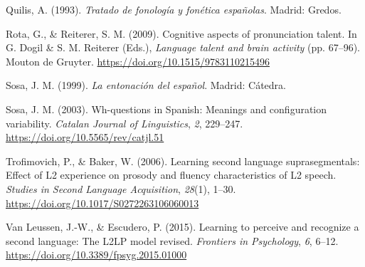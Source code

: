 \documentclass[]{article}
\newlength{\cslhangindent}
\newenvironment{CSLReferences}[2] %
 {%
  \setlength{\parindent}{0pt}
  \ifodd #1 \everypar{\setlength{\hangindent}{\cslhangindent}}\ignorespaces\fi
  \ifnum #2 > 0
  \setlength{\parskip}{#2\baselineskip}
  \fi
 }%
 {}
\begin{document}
\begin{CSLReferences}{1}{0}
\leavevmode{}%
Quilis, A. (1993). \emph{Tratado de fonología y fonética españolas}. Madrid: Gredos.

\leavevmode{}%
Rota, G., \& Reiterer, S. M. (2009). Cognitive aspects of pronunciation talent. In G. Dogil \& S. M. Reiterer (Eds.), \emph{Language talent and brain activity} (pp. 67--96). Mouton de Gruyter. \url{https://doi.org/10.1515/9783110215496}

\leavevmode{}%
Sosa, J. M. (1999). \emph{La entonación del español}. Madrid: Cátedra.

\leavevmode{}%
Sosa, J. M. (2003). Wh-questions in {S}panish: Meanings and configuration variability. \emph{Catalan Journal of Linguistics}, \emph{2}, 229--247. \url{https://doi.org/10.5565/rev/catjl.51}

\leavevmode{}%
Trofimovich, P., \& Baker, W. (2006). Learning second language suprasegmentals: Effect of {L}2 experience on prosody and fluency characteristics of {L}2 speech. \emph{Studies in Second Language Acquisition}, \emph{28}(1), 1--30. \url{https://doi.org/10.1017/S0272263106060013}

\leavevmode{}%
Van Leussen, J.-W., \& Escudero, P. (2015). Learning to perceive and recognize a second language: {T}he {L2LP} model revised. \emph{Frontiers in Psychology}, \emph{6}, 6--12. \url{https://doi.org/10.3389/fpsyg.2015.01000}

\end{CSLReferences}
\end{document}
